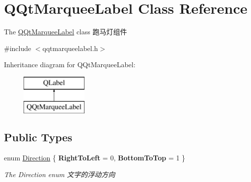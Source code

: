 \hypertarget{class_q_qt_marquee_label}{}\section{Q\+Qt\+Marquee\+Label Class Reference}
\label{class_q_qt_marquee_label}


The \mbox{\hyperlink{class_q_qt_marquee_label}{Q\+Qt\+Marquee\+Label}} class 跑马灯组件  




{\ttfamily \#include $<$qqtmarqueelabel.\+h$>$}

Inheritance diagram for Q\+Qt\+Marquee\+Label\+:\begin{figure}[H]
\begin{center}
\leavevmode
\includegraphics[height=2.000000cm]{class_q_qt_marquee_label}
\end{center}
\end{figure}
\subsection*{Public Types}
\begin{DoxyCompactItemize}
\item 
\mbox{\label{class_q_qt_marquee_label_a9c93af95a748dfd57f793883281822a7}} 
enum \mbox{\hyperlink{class_q_qt_marquee_label_a9c93af95a748dfd57f793883281822a7}{Direction}} \{ {\bfseries Right\+To\+Left} = 0, 
{\bfseries Bottom\+To\+Top} = 1
 \}
\begin{DoxyCompactList}\small\item\em The Direction enum 文字的浮动方向 \end{DoxyCompactList}\end{DoxyCompactItemize}
